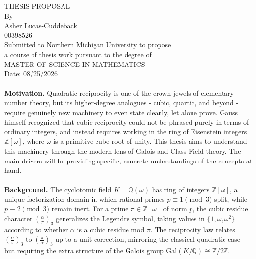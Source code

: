 \documentclass[12pt]{article}
\begin{document}

\thispagestyle{empty}
\begin{center}
  \vspace*{1.5in}
  THESIS PROPOSAL\\[0.25in]
  By\\[0.5in]
  Asher Lucas-Cuddeback\\[0.25in]
  00398526\\[1.75in]
  Submitted to Northern Michigan University to propose\\
  a course of thesis work pursuant to the degree of\\[0.5in]
  MASTER OF SCIENCE IN MATHEMATICS\\[1.5in]
  Date: 08/25/2026
\end{center}


\newpage
\thispagestyle{empty}

\paragraph{} \textbf{Motivation.} Quadratic reciprocity is one of the
crown jewels of elementary number theory, but its higher-degree
analogues - cubic, quartic, and beyond - require genuinely new
machinery to even state cleanly, let alone prove. Gauss himself
recognized that cubic reciprocity could not be phrased purely in
terms of ordinary integers, and instead requires working in the ring
of Eisenstein integers $\mathbb{Z}[\omega]$, where $\omega$ is a
primitive cube root of unity. This thesis aims to understand this
machinery through the modern lens of Galois and Class Field theory.
The main drivers will be providing specific, concrete understandings
of the concepts at hand.

\paragraph{} \textbf{Background.} The cyclotomic field
$K = \mathbb{Q}(\omega)$ has ring of integers $\mathbb{Z}[\omega]$,
a unique factorization domain in which rational primes $p \equiv 1
\pmod 3$ split, while $p \equiv 2 \pmod 3$ remain inert. For a prime
$\pi \in \mathbb{Z}[\omega]$ of norm $p$, the cubic residue character
$\left(\frac{\alpha}{\pi}\right)_3$ generalizes the Legendre symbol,
taking values in $\{1, \omega, \omega^2\}$ according to whether
$\alpha$ is a cubic residue mod $\pi$. The reciprocity law relates
$\left(\frac{\alpha}{\pi}\right)_3$ to $\left(\frac{\pi}{\alpha}\right)_3$
up to a unit correction, mirroring the classical quadratic case but
requiring the extra structure of the Galois group
$\mathrm{Gal}(K/\mathbb{Q}) \cong \mathbb{Z}/2\mathbb{Z}$.
\end{document}
